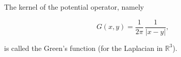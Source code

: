 The kernel of the potential operator, namely

$$G(x,y) = \frac{1}{2\pi} \, \frac{1}{|x - y|},$$

is called the Green's function (for the Laplacian in $\mathbb{R}^3$).
